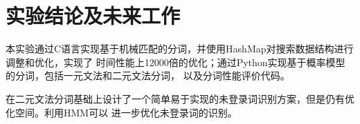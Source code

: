 \section{实验结论及未来工作}

本实验通过C语言实现基于机械匹配的分词，并使用HashMap对搜索数据结构进行调整和优化，实现了
时间性能上12000倍的优化；通过Python实现基于概率模型的分词，包括一元文法和二元文法分词，
以及分词性能评价代码。

在二元文法分词基础上设计了一个简单易于实现的未登录词识别方案，但是仍有优化空间。利用HMM可以
进一步优化未登录词的识别。
